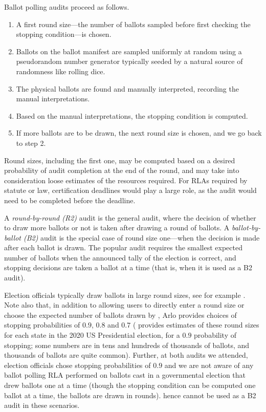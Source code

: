 Ballot polling audits proceed as follows. 
\begin{enumerate}
\item A first round \cite{usenix_minerva} size---the number of ballots sampled before first checking the stopping condition---is chosen. 
\item Ballots on the ballot manifest are sampled uniformly at random using a pseudorandom number generator typically seeded by a natural source of randomness like rolling dice.
\item The physical ballots are found and manually interpreted, recording the manual interpretations. 
\item Based on the manual interpretations, the stopping condition is computed. 
\item If more ballots are to be drawn, the next round size is chosen, and we go back to step 2. 
\end{enumerate} 

Round sizes, including the first one, may be computed based on a desired probability of audit completion at the end of the round, and may take into consideration loose estimates of the resources required. For RLAs required by statute or law, certification deadlines would play a large role, as the audit would need to be completed before the deadline. 

A {\em round-by-round (R2)} audit is the general audit, where the decision of whether to draw more ballots or not is taken after drawing a round of ballots. A {\em ballot-by-ballot (B2)} audit is the special case of round size one---when the decision is made after each ballot is drawn. The popular \BRAVO audit requires the smallest expected number of ballots when the announced tally of the election is correct, and stopping decisions are taken a ballot at a time (that is, when it is used as a B2 audit). 

Election officials typically draw ballots in large round sizes, see for example \cite{va-2022,RI-report}. Note also that, in addition to allowing users to directly enter a round size or choose the expected number of ballots drawn by \BRAVO, Arlo provides choices of stopping probabilities of $0.9$, $0.8$ and $0.7$ (\cite{usenix_minerva} provides estimates of these round sizes for each state in the 2020 US Presidential election, for a $0.9$ probability of stopping; some numbers are in tens and hundreds of thousands of ballots, and thousands of ballots are quite common). Further, at both audits we attended, election officials chose stopping probabilities of $0.9$ and we are not aware of any ballot polling RLA performed on ballots cast in a governmental election that drew ballots one at a time (though the stopping condition can be computed one ballot at a time, the ballots are drawn in rounds). \BRAVO hence cannot be used as a B2 audit in these scenarios. 

